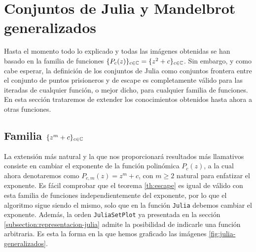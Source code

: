 \section{Conjuntos de Julia y Mandelbrot generalizados}

Hasta el momento todo lo explicado y todas las imágenes obtenidas se han basado en la familia de funciones $\{P_c(z)\}_{c\in\mathbb{C}}=\{z^2+c\}_{c\in\mathbb{C}}$. Sin embargo, y como cabe esperar, la definición de los conjuntos de Julia como conjuntos frontera entre el conjunto de puntos prisioneros y de escape es completamente válido para las iteradas de cualquier función, o mejor dicho, para cualquier familia de funciones. En esta sección trataremos de extender los conocimientos obtenidos hasta ahora a otras funciones.

\subsection{Familia $\{z^m+c\}_{c\in\mathbb{C}}$}
\label{subsection:julia-mandelbrot-generalizados}

La extensión más natural y la que nos proporcionará resultados más llamativos consiste en cambiar el exponente de la función polinómica $P_c(z)$, a la cual ahora denotaremos como $P_{c,m}(z)=z^m+c$, con $m\geq 2$ natural para enfatizar el exponente. Es fácil comprobar que el teorema \ref{th:escape} es igual de válido con esta familia de funciones independientemente del exponente, por lo que el algoritmo sigue siendo el mismo, solo que en la función \verb|Julia| debemos cambiar el exponente. Además, la orden \verb|JuliaSetPlot| ya presentada en la sección \ref{subsection:representacion-julia} admite la posibilidad de indicarle una función arbitraria. Es esta la forma en la que hemos graficado las imágenes \ref{fig:julia-generalizados}.

